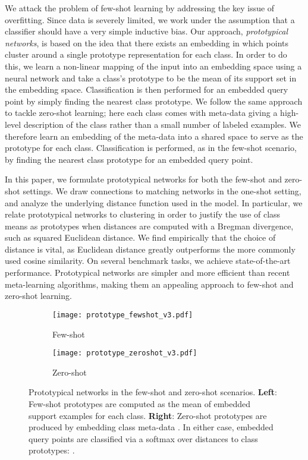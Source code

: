 \documentclass{article}
\begin{document}
We attack the problem of few-shot learning by addressing the key issue of overfitting. Since data is severely limited, we work under the assumption that a classifier should have a very simple inductive bias. Our approach, {\it prototypical networks}, is based on the idea that there exists an embedding in which points cluster around a single prototype representation for each class. In order to do this, we learn a non-linear mapping of the input into an embedding space using a neural network and take a class's prototype to be the mean of its support set in the embedding space. Classification is then performed for an embedded query point by simply finding the nearest class prototype. We follow the same approach to tackle zero-shot learning; here each class comes with meta-data giving a high-level description of the class rather than a small number of labeled examples. We therefore learn an embedding of the meta-data into a shared space to serve as the prototype for each class. Classification is performed, as in the few-shot scenario, by finding the nearest class prototype for an embedded query point.

In this paper, we formulate prototypical networks for both the few-shot and zero-shot settings. We draw connections to matching networks in the one-shot setting, and analyze the underlying distance function used in the model. In particular, we relate prototypical networks to clustering \cite{banerjee2005clustering} in order to justify the use of class means as prototypes when distances are computed with a Bregman divergence, such as squared Euclidean distance. We find empirically that the choice of distance is vital, as Euclidean distance greatly outperforms the more commonly used cosine similarity. On several benchmark tasks, we achieve state-of-the-art performance. Prototypical networks are simpler and more efficient than recent meta-learning algorithms, making them an appealing approach to few-shot and zero-shot learning.
\begin{figure}[tb]
    \centering
    \begin{subfigure}{.5\textwidth}
        \centering
        \texttt{[image: prototype\_fewshot\_v3.pdf]}
        \caption{Few-shot}
    \end{subfigure}\hfill \begin{subfigure}{.5\textwidth}
        \centering
        \texttt{[image: prototype\_zeroshot\_v3.pdf]}
        \caption{Zero-shot}
    \end{subfigure}
    \caption{Prototypical networks in the few-shot and zero-shot scenarios.
    \textbf{Left}: Few-shot prototypes  are computed as the mean of embedded support examples for each class. \textbf{Right}: Zero-shot prototypes  are produced by embedding class meta-data . In either case, embedded query points are classified via a softmax over distances to class prototypes: .}
    \label{fig:protodiagram}
\end{figure}
\end{document}
